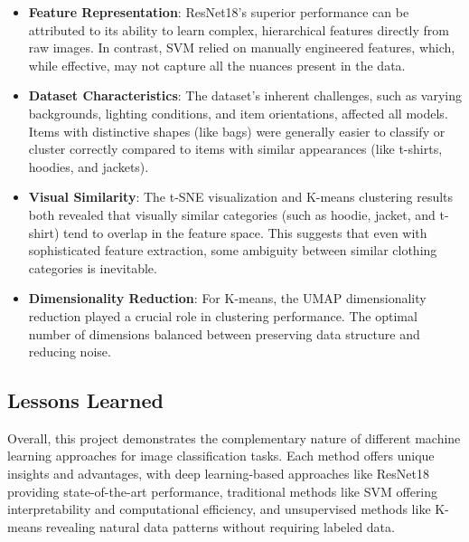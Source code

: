 \documentclass[12pt]{article}
\begin{document}
    \begin{itemize}
        \item \textbf{Feature Representation}: ResNet18's superior performance can be attributed to its ability to learn complex, hierarchical features directly from raw images. In contrast, SVM relied on manually engineered features, which, while effective, may not capture all the nuances present in the data.
        
        \item \textbf{Dataset Characteristics}: The dataset's inherent challenges, such as varying backgrounds, lighting conditions, and item orientations, affected all models. Items with distinctive shapes (like bags) were generally easier to classify or cluster correctly compared to items with similar appearances (like t-shirts, hoodies, and jackets).
        
        \item \textbf{Visual Similarity}: The t-SNE visualization and K-means clustering results both revealed that visually similar categories (such as hoodie, jacket, and t-shirt) tend to overlap in the feature space. This suggests that even with sophisticated feature extraction, some ambiguity between similar clothing categories is inevitable.
        
        \item \textbf{Dimensionality Reduction}: For K-means, the UMAP dimensionality reduction played a crucial role in clustering performance. The optimal number of dimensions balanced between preserving data structure and reducing noise.
    \end{itemize}
    
    \subsection{Lessons Learned}
    Overall, this project demonstrates the complementary nature of different machine learning approaches for image classification tasks. Each method offers unique insights and advantages, with deep learning-based approaches like ResNet18 providing state-of-the-art performance, traditional methods like SVM offering interpretability and computational efficiency, and unsupervised methods like K-means revealing natural data patterns without requiring labeled data.

\printbibliography %

\newpage

\appendix
{} 
\end{document}
